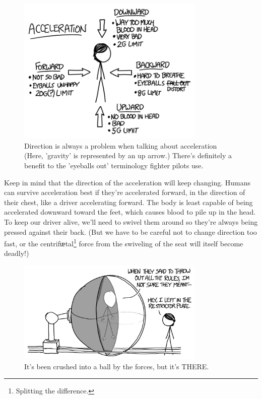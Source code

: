 {\begin{figure}[!htbp]
\centering
\includegraphics[scale=0.5, max width=0.8\textwidth]{imgs/a/116/directions.png}
\caption{Direction is always a problem when talking about acceleration (Here, 'gravity' is represented by an up arrow.) There's definitely a benefit to the 'eyeballs out' terminology fighter pilots use.}
\end{figure}

{Keep in mind that the direction of the acceleration will keep changing. Humans can survive acceleration best if they're accelerated forward, in the direction of their chest, like a driver accelerating forward. The body is least capable of being accelerated downward toward the feet, which causes blood to pile up in the head. To keep our driver alive, we'll need to swivel them around so they're always being pressed against their back. (But we have to be careful not to change direction too fast, or the centrifᵫtal{\footnote{Splitting the difference.} } force from the swiveling of the seat will itself become deadly!)}

\begin{figure}[!htbp]
\centering
\includegraphics[scale=0.5, max width=0.8\textwidth]{imgs/a/116/rules.png}
\caption{It's been crushed into a ball by the forces, but it's THERE.}
\end{figure}

}
